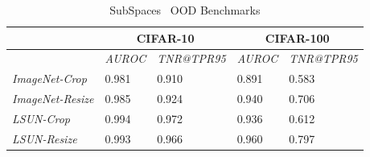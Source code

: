 \documentclass[accepted]{uai2022} %
\begin{document}
    



\begin{table}
    \setlength\tabcolsep{4pt}
    \centering
    \caption{SubSpaces~\citep{Zaeemzadeh:CVPR:2021:out} OOD Benchmarks}
        \label{Tab:ood_subspaces}
         
        \begin{tabular}{@{}lllll@{}}
            \toprule
                                      & \multicolumn{2}{c}{CIFAR-10}      & \multicolumn{2}{c}{CIFAR-100}     \\ \midrule
                                      & \textit{AUROC} & \textit{TNR@TPR95} & \textit{AUROC} & \textit{TNR@TPR95} \\\midrule
            \textit{ImageNet-Crop}    & 0.981          &  0.910             & 0.891          &  0.583           \\
            \textit{ImageNet-Resize}  & 0.985          &  0.924             & 0.940          &  0.706           \\
            \textit{LSUN-Crop}        & 0.994          &  0.972             & 0.936          &  0.612           \\
            \textit{LSUN-Resize}      & 0.993          &  0.966             & 0.960          &  0.797           \\ \bottomrule
        \end{tabular}
    \end{table}
    
\end{document}
